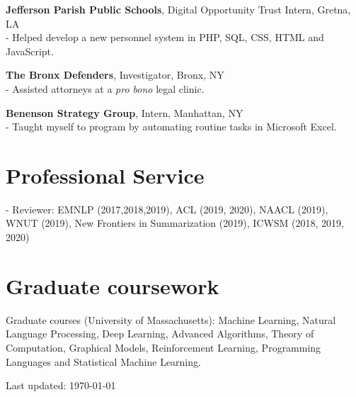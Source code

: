 \documentclass[10pt, a4paper]{article}
\newcommand{\years}[1]{\marginnote{\normalsize #1}}
\begin{document}
\medskip

\years{2010}\textbf{Jefferson Parish Public Schools}, Digital Opportunity Trust Intern, Gretna, LA \\ 
- Helped develop a new personnel system in PHP, SQL, CSS, HTML and JavaScript.

\medskip

\years{2007-2009}\textbf{The Bronx Defenders}, Investigator, Bronx, NY \\ 
- Assisted attorneys at a  \textit{pro bono} legal clinic.

\medskip

\years{2006}\textbf{Benenson Strategy Group}, Intern, Manhattan, NY \\ 
- Taught myself to program by automating routine tasks in Microsoft Excel.

\section*{Professional Service}
- Reviewer: EMNLP (2017,2018,2019), ACL (2019, 2020), NAACL (2019), WNUT (2019), New Frontiers in Summarization (2019), ICWSM (2018, 2019, 2020)

\section*{Graduate coursework}

Graduate courses (University of Massachusetts): Machine Learning, Natural Language Processing, Deep Learning, Advanced Algorithms, Theory of Computation, Graphical Models, Reinforcement Learning, Programming Languages and Statistical Machine Learning.

\begin{center}
{\scriptsize  Last updated: \today\-
\\}
\end{center}
\end{document}
